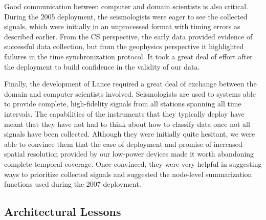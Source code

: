 \begin{itemize}
Good communication between computer and domain scientists is also critical.
During the 2005 deployment, the seismologists were eager to see the collected
signals, which were initially in an unprocessed format with timing errors as
described earlier. From the CS perspective, the early data provided evidence
of successful data collection, but from the geophysics perspective it
highlighted failures in the time synchronization protocol. It took a great
deal of effort after the deployment to build confidence in the validity of
our data.

Finally, the development of Lance required a great deal of exchange between
the domain and computer scientists involved. Seismologists are used to
systems able to provide complete, high-fidelity signals from all stations
spanning all time intervals. The capabilities of the instruments that they
typically deploy have meant that they have not had to think about how to
classify data once not all signals have been collected. Although they were
initially quite hesitant, we were able to convince them that the ease of
deployment and promise of increased spatial resolution provided by our
low-power devices made it worth abandoning complete temporal coverage. Once
convinced, they were very helpful in suggesting ways to prioritize collected
signals and suggested the node-level summarization functions used during the
2007 deployment.

\end{itemize}

\subsection{Architectural Lessons}

